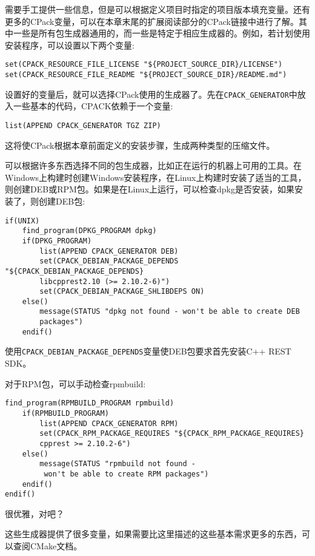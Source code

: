 需要手工提供一些信息，但是可以根据定义项目时指定的项目版本填充变量。还有更多的CPack变量，可以在本章末尾的扩展阅读部分的CPack链接中进行了解。其中一些是所有包生成器通用的，而一些是特定于相应生成器的。例如，若计划使用安装程序，可以设置以下两个变量:

\begin{lstlisting}[style=styleCMake]
set(CPACK_RESOURCE_FILE_LICENSE "${PROJECT_SOURCE_DIR}/LICENSE")
set(CPACK_RESOURCE_FILE_README "${PROJECT_SOURCE_DIR}/README.md")
\end{lstlisting}

设置好的变量后，就可以选择CPack使用的生成器了。先在\texttt{CPACK\_GENERATOR}中放入一些基本的代码，CPACK依赖于一个变量:

\begin{lstlisting}[style=styleCMake]
list(APPEND CPACK_GENERATOR TGZ ZIP)
\end{lstlisting}

这将使CPack根据本章前面定义的安装步骤，生成两种类型的压缩文件。

可以根据许多东西选择不同的包生成器，比如正在运行的机器上可用的工具。在Windows上构建时创建Windows安装程序，在Linux上构建时安装了适当的工具，则创建DEB或RPM包。如果是在Linux上运行，可以检查dpkg是否安装，如果安装了，则创建DEB包:

\begin{lstlisting}[style=styleCMake]
if(UNIX)
	find_program(DPKG_PROGRAM dpkg)
	if(DPKG_PROGRAM)
		list(APPEND CPACK_GENERATOR DEB)
		set(CPACK_DEBIAN_PACKAGE_DEPENDS "${CPACK_DEBIAN_PACKAGE_DEPENDS}
		libcpprest2.10 (>= 2.10.2-6)")
		set(CPACK_DEBIAN_PACKAGE_SHLIBDEPS ON)
	else()
		message(STATUS "dpkg not found - won't be able to create DEB
		packages")
	endif()
\end{lstlisting}

使用\texttt{CPACK\_DEBIAN\_PACKAGE\_DEPENDS}变量使DEB包要求首先安装C++ REST SDK。

对于RPM包，可以手动检查rpmbuild:

\begin{lstlisting}[style=styleCMake]
	find_program(RPMBUILD_PROGRAM rpmbuild)
	if(RPMBUILD_PROGRAM)
		list(APPEND CPACK_GENERATOR RPM)
		set(CPACK_RPM_PACKAGE_REQUIRES "${CPACK_RPM_PACKAGE_REQUIRES} 
		cpprest >= 2.10.2-6")
	else()
		message(STATUS "rpmbuild not found -
		 won't be able to create RPM packages")
	endif()
endif()
\end{lstlisting}

很优雅，对吧？

这些生成器提供了很多变量，如果需要比这里描述的这些基本需求更多的东西，可以查阅CMake文档。

